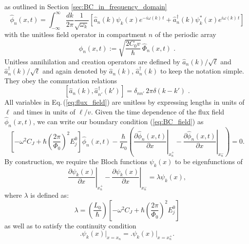 as outlined in Section \ref{sec:BC_in_frequency_domain}  
%
\begin{equation} \label{eq:flux_field}
    \hat{\phi}_n(x,t) = 
    \int_{-\infty}^{\infty}\frac{dk}{2 \pi} \frac{1}{\sqrt{\omega_k}}
    \left[ \hat{a}_n(k) \psi_k(x)e^{-i \omega(k) \, t} + 
    \hat{a}_n^{\dagger}(k) \psi_k^*(x) e^{i \omega(k) \, t} \right]
\end{equation}
%
with the unitless field operator in compartment $n$ of the periodic array
%
\begin{equation} \label{eq:ufo}
\hat{\phi}_n(x,t) := \sqrt{\frac{2 C_0 v}{\hbar}} \, \hat{\Phi}_n(x,t) \, \, .
\end{equation}
%
Unitless annihilation and creation operators are defined by $\hat{a}_n(k)/\sqrt{\ell}$ 
and ${\hat a}_{n}^\dagger(k) / \sqrt{\ell}$ and again denoted by
$\hat{a}_n(k)$, ${\hat a}_{n}^\dagger(k)$ to keep the notation simple. 
They obey the commutation relations 
%
\begin{equation} \label{eq:cra}
    \left[ \hat{a}_n(k),{\hat a}_{n'}^\dagger(k') \right] = \delta_{nn'} \, 2 \pi \delta(k - k') \, \, .
\end{equation}
%
All variables in Eq.\,(\ref{eq:flux_field}) are unitless by expressing lengths in units of $\ell$
and times in units of $\ell/v$.
%
\color{black}
%
%
Given the time dependence of the flux field $\hat{\phi}_n(x,t)$, we can write our boundary condition (\ref{eq:BC_field}) as
%
\begin{equation}
\left[-\omega^2 C_{J}+\hbar\left(\frac{2 \pi}{\Phi_{0}}\right)^{2} E_{j}^0\right]\hat{\phi}_n(x,t) -\frac{\hbar}{L_{0}}\left(\left.\frac{\partial \hat{\phi}_n(x,t)}{\partial x}\right|_{x_n^{+}}-\left.\frac{\partial \hat{\phi}_n(x,t)}{\partial x}\right|_{x_n^{-}}\right)=0.
\end{equation}
%
By construction, we require the Bloch functions $\psi_k(x)$ to be eigenfunctions of
%
\begin{equation}\label{eq:bloch_eigenvalproblem}
\left.\frac{\partial\psi_{k}(x)}{\partial x}\right|_{x_n^{+}}-\left.\frac{\partial\psi_{k}(x)}{\partial x}\right|_{x_n^{-}}=\lambda \psi_k(x),
\end{equation}
%
where $\lambda$ is defined as:
%
\begin{equation}
\lambda = \left(\frac{L_0}{\hbar}\right)  
\left[-\omega^2 C_{J}+\hbar\left(\frac{2 \pi}{\Phi_{0}}\right)^{2} E_{j}^0\right]
\end{equation}
%
as well as to satisfy the continuity condition
%
\begin{equation}\label{eq:continuity_bloch}
\biggl.\psi_{k}(x)\biggl|_{x=x_{n}}=\biggl.\psi_{k}(x)\biggr|_{x=x_{n}^{+}}.
\end{equation}

